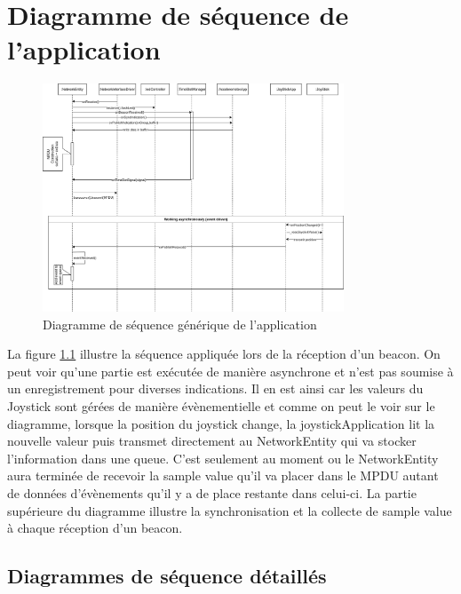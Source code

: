 \documentclass{report}
\begin{document}
\chapter{Diagramme de séquence de l'application}
\begin{figure}[H]
    \centering
    \includegraphics[width= 0.8\textwidth]{Images/SequenceDiagram.png}
    \caption{Diagramme de séquence générique de l'application}
    \label{fig:SequenceDiagram}
\end{figure}
La figure \ref{fig:SequenceDiagram} illustre la séquence appliquée lors de la réception d'un beacon. On peut voir qu'une partie est exécutée de manière asynchrone et n'est pas soumise à un enregistrement pour diverses indications. Il en est ainsi car les valeurs du Joystick sont gérées de manière évènementielle et comme on peut le voir sur le diagramme, lorsque la position du joystick change, la joystickApplication lit la nouvelle valeur puis transmet directement au NetworkEntity qui va stocker l'information dans une queue. C'est seulement au moment ou le NetworkEntity aura terminée de recevoir la sample value qu'il va placer dans le MPDU autant de données d'évènements qu'il y a de place restante dans celui-ci. La partie supérieure du diagramme illustre la synchronisation et la collecte de sample value à chaque réception d'un beacon.
\section{Diagrammes de séquence détaillés}
\end{document}
